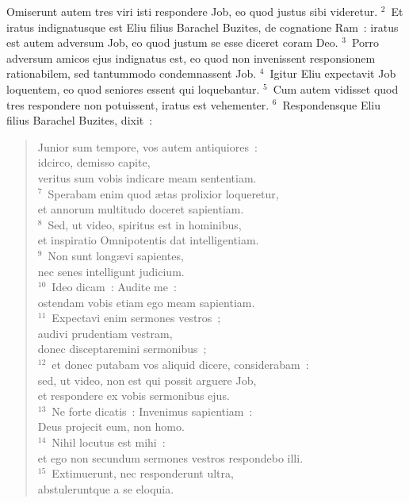 \lettrine[lines=10,image=true,loversize=0.05,lraise=-0.03]{O}{}miserunt autem tres viri isti respondere Job, eo quod justus sibi videretur.
${}^{2}$~Et iratus indignatusque est Eliu filius Barachel Buzites, de cognatione Ram~: iratus est autem adversum Job, eo quod justum se esse diceret coram Deo.
${}^{3}$~Porro adversum amicos ejus indignatus est, eo quod non invenissent responsionem rationabilem, sed tantummodo condemnassent Job.
${}^{4}$~Igitur Eliu expectavit Job loquentem, eo quod seniores essent qui loquebantur.
${}^{5}$~Cum autem vidisset quod tres respondere non potuissent, iratus est vehementer.
${}^{6}$~Respondensque Eliu filius Barachel Buzites, dixit~: \begin{flushleft}\begin{verse}Junior sum tempore, vos autem antiquiores~:\\ idcirco, demisso capite,\\ veritus sum vobis indicare meam sententiam.\\
${}^{7}$~Sperabam enim quod \ae tas prolixior loqueretur,\\ et annorum multitudo doceret sapientiam.\\
${}^{8}$~Sed, ut video, spiritus est in hominibus,\\ et inspiratio Omnipotentis dat intelligentiam.\\
${}^{9}$~Non sunt long\ae vi sapientes,\\ nec senes intelligunt judicium.\\
${}^{10}$~Ideo dicam~: Audite me~:\\ ostendam vobis etiam ego meam sapientiam.\\
${}^{11}$~Expectavi enim sermones vestros~;\\ audivi prudentiam vestram,\\ donec disceptaremini sermonibus~;\\
${}^{12}$~et donec putabam vos aliquid dicere, considerabam~:\\ sed, ut video, non est qui possit arguere Job,\\ et respondere ex vobis sermonibus ejus.\\
${}^{13}$~Ne forte dicatis~: Invenimus sapientiam~:\\ Deus projecit eum, non homo.\\
${}^{14}$~Nihil locutus est mihi~:\\ et ego non secundum sermones vestros respondebo illi.\\
${}^{15}$~Extimuerunt, nec responderunt ultra,\\ abstuleruntque a se eloquia.\\

\end{verse}
\end{flushleft}
